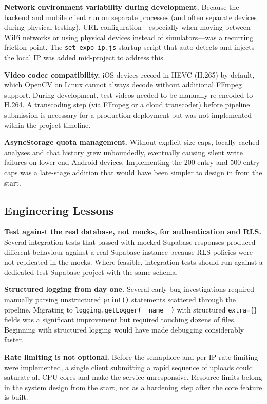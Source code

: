 \textbf{Network environment variability during development.}
Because the backend and mobile client run on separate processes (and often separate devices during physical testing), URL configuration---especially when moving between WiFi networks or using physical devices instead of simulators---was a recurring friction point. The \lstinline|set-expo-ip.js| startup script that auto-detects and injects the local IP was added mid-project to address this.

\textbf{Video codec compatibility.}
iOS devices record in HEVC (H.265) by default, which OpenCV on Linux cannot always decode without additional FFmpeg support. During development, test videos needed to be manually re-encoded to H.264. A transcoding step (via FFmpeg or a cloud transcoder) before pipeline submission is necessary for a production deployment but was not implemented within the project timeline.

\textbf{AsyncStorage quota management.}
Without explicit size caps, locally cached analyses and chat history grew unboundedly, eventually causing silent write failures on lower-end Android devices. Implementing the 200-entry and 500-entry caps was a late-stage addition that would have been simpler to design in from the start.

\subsection{Engineering Lessons}

\textbf{Test against the real database, not mocks, for authentication and RLS.}
Several integration tests that passed with mocked Supabase responses produced different behaviour against a real Supabase instance because RLS policies were not replicated in the mocks. Where feasible, integration tests should run against a dedicated test Supabase project with the same schema.

\textbf{Structured logging from day one.}
Several early bug investigations required manually parsing unstructured \lstinline|print()| statements scattered through the pipeline. Migrating to \lstinline|logging.getLogger(__name__)| with structured \lstinline|extra={}| fields was a significant improvement but required touching dozens of files. Beginning with structured logging would have made debugging considerably faster.

\textbf{Rate limiting is not optional.}
Before the semaphore and per-IP rate limiting were implemented, a single client submitting a rapid sequence of uploads could saturate all CPU cores and make the service unresponsive. Resource limits belong in the system design from the start, not as a hardening step after the core feature is built.

